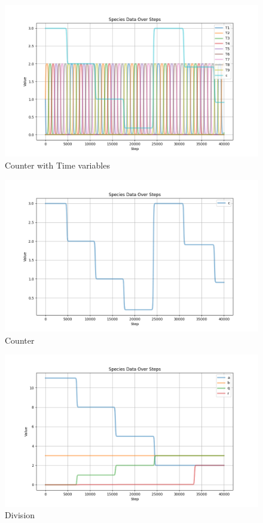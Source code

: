 \begin{figure}[H]
    \centering
    \includegraphics{report/figures/counterWithTimeVars.png}
    \caption{Counter with Time variables}
    \label{fig:counter_time}
\end{figure}

\begin{figure}[H]
    \centering
    \includegraphics[width=\textwidth]{report/figures/SimulatorPlots/counterSim.png}
    \caption{Counter}
\end{figure}

\begin{figure}[H]
    \centering
    \includegraphics[width=\textwidth]{report/figures/SimulatorPlots/divisionSim.png}
    \caption{Division}
\end{figure}

